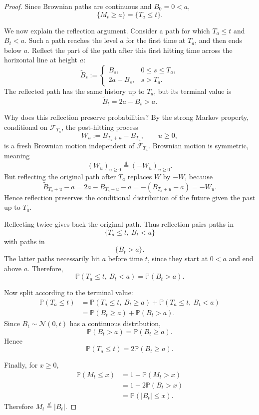 \begin{proof}
Since Brownian paths are continuous and $B_0=0<a$,
\[
\{M_t\ge a\}=\{T_a\le t\}.
\]

We now explain the reflection argument. Consider a path for which
$T_a\le t$ and $B_t<a$. Such a path reaches the level $a$ for the first
time at $T_a$, and then ends below $a$. Reflect the part of the path after
this first hitting time across the horizontal line at height $a$:
\[
\widetilde B_s:=
\begin{cases}
B_s, & 0\le s\le T_a,\\
2a-B_s, & s>T_a.
\end{cases}
\]
The reflected path has the same history up to $T_a$, but its terminal value is
\[
\widetilde B_t=2a-B_t>a.
\]

Why does this reflection preserve probabilities? By the strong Markov
property, conditional on $\mathcal{F}_{T_a}$, the post-hitting process
\[
W_u:=B_{T_a+u}-B_{T_a},\qquad u\ge0,
\]
is a fresh Brownian motion independent of $\mathcal{F}_{T_a}$. Brownian
motion is symmetric, meaning
\[
(W_u)_{u\ge0}\overset{d}{=}(-W_u)_{u\ge0}.
\]
But reflecting the original path after $T_a$ replaces $W$ by $-W$, because
\[
\widetilde B_{T_a+u}-a
=
2a-B_{T_a+u}-a
=
-(B_{T_a+u}-a)
=
-W_u.
\]
Hence reflection preserves the conditional distribution of the future given
the past up to $T_a$.

Reflecting twice gives back the original path. Thus reflection pairs paths in
\[
\{T_a\le t,\ B_t<a\}
\]
with paths in
\[
\{B_t>a\}.
\]
The latter paths necessarily hit $a$ before time $t$, since they start at
$0<a$ and end above $a$. Therefore,
\[
\mathbb{P}(T_a\le t,\ B_t<a)=\mathbb{P}(B_t>a).
\]

Now split according to the terminal value:
\[
\begin{aligned}
\mathbb{P}(T_a\le t)
&=
\mathbb{P}(T_a\le t,\ B_t\ge a)
+
\mathbb{P}(T_a\le t,\ B_t<a) \\
&=
\mathbb{P}(B_t\ge a)+\mathbb{P}(B_t>a).
\end{aligned}
\]
Since $B_t\sim\mathcal{N}(0,t)$ has a continuous distribution,
\[
\mathbb{P}(B_t>a)=\mathbb{P}(B_t\ge a).
\]
Hence
\[
\mathbb{P}(T_a\le t)=2\mathbb{P}(B_t\ge a).
\]

Finally, for $x\ge0$,
\[
\begin{aligned}
\mathbb{P}(M_t\le x)
&=1-\mathbb{P}(M_t>x) \\
&=1-2\mathbb{P}(B_t>x) \\
&=\mathbb{P}(|B_t|\le x).
\end{aligned}
\]
Therefore $M_t\overset{d}{=}|B_t|$.
\end{proof}
